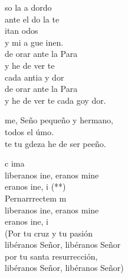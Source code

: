 \documentclass[12pt]{article}
\begin{document}
\begin{multicols*}{2}
\begin{cancion}%
	so la a dordo \\
	ante el do  la te\\
	itan  odos\\
	y mi a gue inen.\\
\jump
	 de orar ante la Para \\
	y he de ver te \\
	cada antia y dor\\
	 de orar ante la Para\\
	y he de ver te cada goy dor.\\
\end{cancion}%

\begin{cancion}%
	me, Seño pequeño y hermano,\\
	 todos el úmo.\\
	te tu gdeza he de ser peeño.\\
\end{cancion}%

\begin{cancion}%
	 c  ima\\
	liberanos ine, eranos mine\\
	eranos ine, i (**)\\
	Pernarrrectem m\\
	liberanos ine, eranos mine\\
	eranos ine, i\\
(Por tu cruz y tu pasión\\
 libéranos Señor, libéranos Señor\\
 por tu santa resurrección,\\
 libéranos Señor, libéranos Señor)\\
\end{cancion}%


\end{multicols*}
\end{document}
